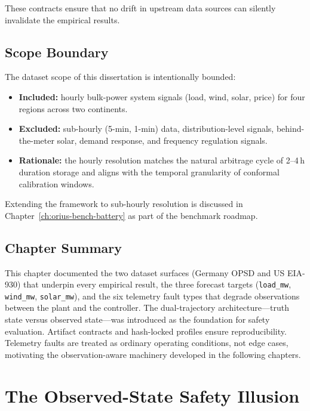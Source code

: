 These contracts ensure that no drift in upstream data sources can silently
invalidate the empirical results.

\subsection{Scope Boundary}

The dataset scope of this dissertation is intentionally bounded:

\begin{itemize}
  \item \textbf{Included:} hourly bulk-power system signals (load, wind,
    solar, price) for four regions across two continents.
  \item \textbf{Excluded:} sub-hourly (5-min, 1-min) data, distribution-level
    signals, behind-the-meter solar, demand response, and frequency regulation
    signals.
  \item \textbf{Rationale:} the hourly resolution matches the natural
    arbitrage cycle of 2--4\,h duration storage and aligns with the temporal
    granularity of conformal calibration windows.
\end{itemize}

Extending the framework to sub-hourly resolution is discussed in
Chapter~\ref{ch:orius-bench-battery} as part of the benchmark roadmap.

\subsection{Chapter Summary}

This chapter documented the two dataset surfaces (Germany OPSD and US EIA-930)
that underpin every empirical result, the three forecast targets (\texttt{load\_mw},
\texttt{wind\_mw}, \texttt{solar\_mw}), and the six telemetry fault types that
degrade observations between the plant and the controller.  The dual-trajectory
architecture---truth state versus observed state---was introduced as the
foundation for safety evaluation.  Artifact contracts and hash-locked profiles
ensure reproducibility.  Telemetry faults are treated as ordinary operating
conditions, not edge cases, motivating the observation-aware machinery
developed in the following chapters.



\section{The Observed-State Safety Illusion}
\label{ch:safety-illusion}

